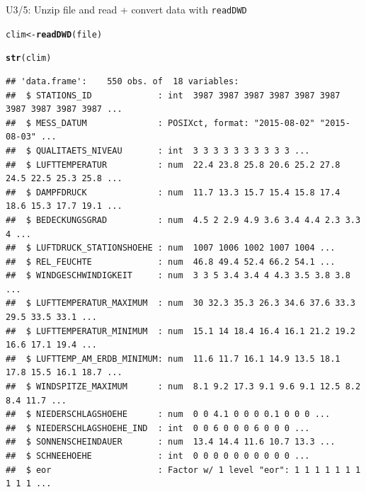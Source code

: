 \documentclass[compress, xcolor=dvipsnames]{beamer}\usepackage[]{graphicx}\usepackage[]{color}
\makeatletter
\newcommand{\hlstd}[1]{\textcolor[rgb]{0.345,0.345,0.345}{#1}}%
\newcommand{\hlkwb}[1]{\textcolor[rgb]{0.69,0.353,0.396}{#1}}%
\newcommand{\hlkwd}[1]{\textcolor[rgb]{0.737,0.353,0.396}{\textbf{#1}}}%
\newenvironment{kframe}{%
 \def\at@end@of@kframe{}%
 \ifinner\ifhmode%
  \def\at@end@of@kframe{\end{minipage}}%
  \begin{minipage}{\columnwidth}%
 \fi\fi%
 \def\FrameCommand##1{\hskip\@totalleftmargin \hskip-\fboxsep
 \colorbox{shadecolor}{##1}\hskip-\fboxsep
     \hskip-\linewidth \hskip-\@totalleftmargin \hskip\columnwidth}%
 \MakeFramed {\advance\hsize-\width
   \@totalleftmargin\z@ \linewidth\hsize
   \@setminipage}}%
 {\par\unskip\endMakeFramed%
 \at@end@of@kframe}
\newenvironment{knitrout}{}{} %
\makeatother
\begin{document}
\begin{frame}[fragile]{U3/5: Unzip file and read + convert data with \texttt{readDWD}}
\label{ur}
\pause
\begin{knitrout}
\color{fgcolor}\begin{kframe}
\begin{alltt}
\hlstd{clim} \hlkwb{<-} \hlkwd{readDWD}\hlstd{(file)}
\end{alltt}
\end{kframe}
\end{knitrout}
\pause
\begin{knitrout}\tiny
{}\color{fgcolor}\begin{kframe}
\begin{alltt}
\hlkwd{str}\hlstd{(clim)}
\end{alltt}
\begin{verbatim}
## 'data.frame':	550 obs. of  18 variables:
##  $ STATIONS_ID             : int  3987 3987 3987 3987 3987 3987 3987 3987 3987 3987 ...
##  $ MESS_DATUM              : POSIXct, format: "2015-08-02" "2015-08-03" ...
##  $ QUALITAETS_NIVEAU       : int  3 3 3 3 3 3 3 3 3 3 ...
##  $ LUFTTEMPERATUR          : num  22.4 23.8 25.8 20.6 25.2 27.8 24.5 22.5 25.3 25.8 ...
##  $ DAMPFDRUCK              : num  11.7 13.3 15.7 15.4 15.8 17.4 18.6 15.3 17.7 19.1 ...
##  $ BEDECKUNGSGRAD          : num  4.5 2 2.9 4.9 3.6 3.4 4.4 2.3 3.3 4 ...
##  $ LUFTDRUCK_STATIONSHOEHE : num  1007 1006 1002 1007 1004 ...
##  $ REL_FEUCHTE             : num  46.8 49.4 52.4 66.2 54.1 ...
##  $ WINDGESCHWINDIGKEIT     : num  3 3 5 3.4 3.4 4 4.3 3.5 3.8 3.8 ...
##  $ LUFTTEMPERATUR_MAXIMUM  : num  30 32.3 35.3 26.3 34.6 37.6 33.3 29.5 33.5 33.1 ...
##  $ LUFTTEMPERATUR_MINIMUM  : num  15.1 14 18.4 16.4 16.1 21.2 19.2 16.6 17.1 19.4 ...
##  $ LUFTTEMP_AM_ERDB_MINIMUM: num  11.6 11.7 16.1 14.9 13.5 18.1 17.8 15.5 16.1 18.7 ...
##  $ WINDSPITZE_MAXIMUM      : num  8.1 9.2 17.3 9.1 9.6 9.1 12.5 8.2 8.4 11.7 ...
##  $ NIEDERSCHLAGSHOEHE      : num  0 0 4.1 0 0 0 0.1 0 0 0 ...
##  $ NIEDERSCHLAGSHOEHE_IND  : int  0 0 6 0 0 0 6 0 0 0 ...
##  $ SONNENSCHEINDAUER       : num  13.4 14.4 11.6 10.7 13.3 ...
##  $ SCHNEEHOEHE             : int  0 0 0 0 0 0 0 0 0 0 ...
##  $ eor                     : Factor w/ 1 level "eor": 1 1 1 1 1 1 1 1 1 1 ...
\end{verbatim}
\end{kframe}
\end{knitrout}
\end{frame}
\end{document}
